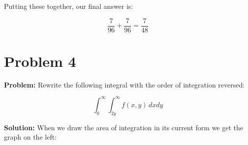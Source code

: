 \documentclass{article}
\begin{document}
Putting these together, our final answer is:

$$\frac{7}{96}+\frac{7}{96}=\frac{7}{48}$$

\section*{Problem 4}
\noindent\textbf{Problem:} Rewrite the following integral with the order of integration reversed:

$$\int_0^\infty\int_{2y}^\infty f(x,y)\,dxdy$$
\pagebreak

\noindent\textbf{Solution:} When we draw the area of integration in its current form we get the graph on the left:

\end{document}
